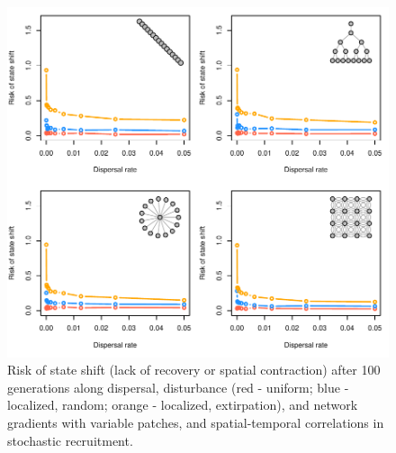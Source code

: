 \documentclass[]{article}
\begin{document}
\begin{figure}[H]

{\centering \includegraphics{Managing_for_ecological_surprises_in_metapopulations_makeHTML_files/figure-latex/state shifts with variable patches and space-time stochasticity-1} 

}

\caption{Risk of state shift (lack of recovery or spatial contraction) after 100 generations along dispersal, disturbance (red - uniform; blue - localized, random; orange - localized, extirpation), and network gradients with variable patches, and spatial-temporal correlations in stochastic recruitment.}\label{fig:state shifts with variable patches and space-time stochasticity}
\end{figure}
\end{document}
